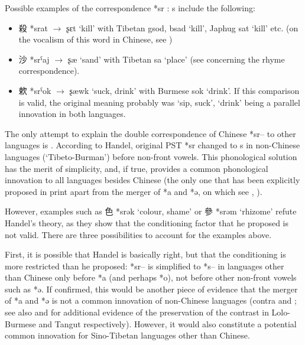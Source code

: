 \documentclass[oldfontcommands,oneside,a4paper,11pt]{article}
\newcommand{\ipa}[1]{{\phon #1}} %
\newcommand{\zh}[1]{{\cn #1}}
\newcommand{\archaic}[4]{\zh{#1} *\ipa{#2} $\rightarrow$ \ipa{#3} `#4'}
\begin{document}
Possible examples of the correspondence *\ipa{sr} : \ipa{s} include the following:

\begin{itemize}

\item  \archaic{殺}{srat}{ʂɛt}{kill} with Tibetan \ipa{gsod, bsad} `kill', Japhug \ipa{sat} `kill' etc. (on the vocalism of this word in Chinese, see \citealt[214]{bs14oc})

\item \archaic{沙}{srˁaj}{ʂæ}{sand}  with Tibetan \ipa{sa} `place' (see \citealt{hill14jrn} concerning the rhyme correspondence).

\item  \archaic{欶}{srˁok}{ʂæwk}{suck, drink} with Burmese \ipa{sok} `drink'. If this comparison is valid, the original meaning probably was `sip, suck', `drink' being a parallel innovation in both languages.

\end{itemize}
The only attempt to explain the double correspondence of Chinese *\ipa{sr--} to other languages is \citet[25]{handel02r}. According to Handel, original PST *\ipa{sr} changed to s in non-Chinese languages (`Tibeto-Burman') before non-front vowels. This phonological solution has the merit of simplicity, and, if true, provides a common phonological innovation to all languages besides Chinese (the only one that has been explicitly proposed in print apart from the merger of *\ipa{a} and *\ipa{ə}, on which see \citealt{gong95st}, \citealt{handel08st}). 

However, examples such as \zh{色} *\ipa{srək} `colour, shame' or \zh{參} *\ipa{srəm} `rhizome' refute Handel's theory, as they show that the conditioning factor that he proposed is not valid. There are three possibilities to account for the examples above.

First, it is possible that Handel is basically right, but that the conditioning is more restricted than he proposed: *\ipa{sr--} is simplified to *\ipa{s--} in languages other than Chinese only before *\ipa{a} (and perhaps *\ipa{o}), not before other non-front vowels such as *\ipa{ə}. If confirmed, this would be another piece of evidence that the merger of *\ipa{a} and *\ipa{ə} is not a common innovation of non-Chinese languages (contra \citealt{gong95st} and \citealt{handel08st}; see also \citealt{hill14jrn} and \citealt[75-6]{jacques14esquisse} for additional evidence of the preservation of the contrast in Lolo-Burmese and Tangut respectively). However, it would also constitute a potential common innovation for Sino-Tibetan languages other than Chinese.
\end{document}
